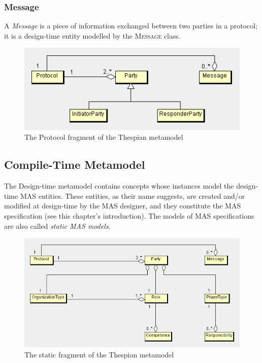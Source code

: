 \subsubsection*{Message}

A \textit{Message} is a piece of information exchanged between two parties in a protocol; it is a design-time entity modelled by the \textsc{Message} class.

\begin{figure}[ht]
	\centering
	\includegraphics[width=\textwidth]{images/thespian/protocol-metamodel.png}
	\caption{The Protocol fragment of the Thespian metamodel}
	\label{figure:thespian-protocol-metamodel}
\end{figure}

\subsection{Compile-Time Metamodel}	

The Design-time metamodel contains concepts whose instances model the design-time MAS entities.
These entities, as their name suggests, are created and/or modified at design-time by the MAS designer, and they constitute the MAS specification (see this chapter's introduction).
The models of MAS specifications are also called \textit{static MAS models}.

\begin{figure}[ht]
	\centering
	\includegraphics[width=\textwidth]{images/thespian/compile-time-metamodel.png}
	\caption{The static fragment of the Thespian metamodel}
	\label{figure:thespian-static-metamodel}
\end{figure}

